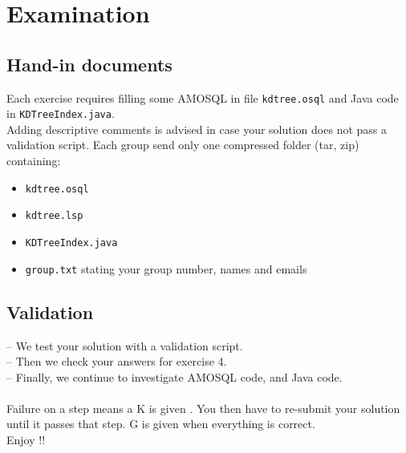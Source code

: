 \documentclass[12pt]{article}
\begin{document}
\section{Examination}
\subsection{Hand-in documents} \label{handin}
Each exercise requires filling some AMOSQL in file \texttt{kdtree.osql} and Java code in  \texttt{KDTreeIndex.java}.\\
Adding descriptive comments is advised in case your solution does not pass a validation script. Each group send only one compressed folder (tar, zip) containing:
\begin{itemize}
\item \texttt{kdtree.osql}
\item \texttt{kdtree.lsp}
\item \texttt{KDTreeIndex.java}
\item \texttt{group.txt} stating your group number, names and emails
\end{itemize}
\subsection{Validation} \label{validation}
-- We test your solution with a validation script.\\
-- Then we check your answers for exercise 4.\\
-- Finally, we continue to investigate AMOSQL code, and Java code.\\\\
Failure on a step means a K is given . You then have to re-submit your solution until it passes that step. G is given when everything is correct.\\
Enjoy !! 
\end{document}
